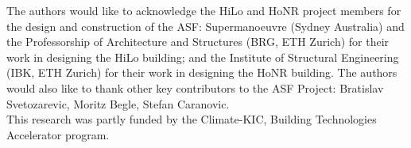 
The authors would like to acknowledge the HiLo and HoNR project members for the design and construction of the ASF: Supermanoeuvre (Sydney Australia) and the Professorship of Architecture and Structures (BRG, ETH Zurich) for their work in designing the HiLo building; and the Institute of Structural Engineering (IBK, ETH Zurich) for their work in designing the HoNR building. The authors would also like to thank other key contributors to the ASF Project: Bratislav Svetozarevic, Moritz Begle, Stefan Caranovic. \\

This research was partly funded by the Climate-KIC, Building Technologies Accelerator program.
